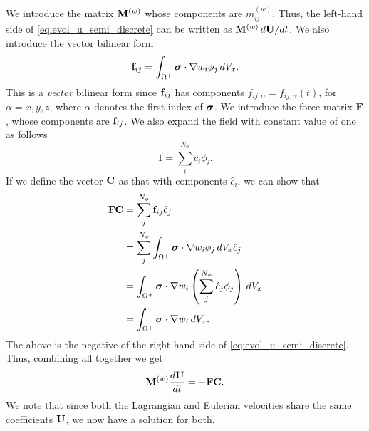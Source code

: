 \documentclass[11pt]{report}
\begin{document}
We introduce the matrix $\mathbf{M}^{(w)}$ whose components are $m_{ij}^{(w)}$. Thus, the left-hand side of \cref{eq:evol_u_semi_discrete} can be written as $\mathbf{M}^{(w)} \, d\mathbf{U} / dt$.
We also introduce the vector bilinear form
\begin{equation}
    \mathbf{f}_{ij} = \int_{\Omega^+} \bm \sigma \cdot \nabla w_i \phi_j \, dV_x.
\end{equation}
This is a \textit{vector} bilinear form since $\mathbf{f}_{ij}$ has components $f_{ij,\alpha} = f_{ij,\alpha}(t)$, for $\alpha = x,y,z$, where $\alpha$ denotes the first index of $\bm \sigma$. We introduce the force matrix $\mathbf{F}$, whose components are $\mathbf{f}_{ij}$. We also expand the field with constant value of one as follows
\begin{equation}
    1 = \sum_i^{N_\phi} \hat{c}_i \phi_i.
\end{equation}
If we define the vector $\mathbf{C}$ as that with components $\hat{c}_i$, we can show that 
\begin{align}
    \mathbf{F} \mathbf{C} &= \sum_j^{N_\phi} \mathbf{f}_{ij} \hat{c}_j \nonumber \\
    &= \sum_j^{N_\phi} \int_{\Omega^+} \bm \sigma \cdot \nabla w_i \phi_j \, dV_x \hat{c}_j \nonumber \\
    &= \int_{\Omega^+} \bm \sigma \cdot \nabla w_i \left ( \sum_j^{N_\phi} \hat{c}_j \phi_j \right ) \, dV_x \nonumber \\
    &= \int_{\Omega^+} \bm \sigma \cdot \nabla w_i \, dV_x.
\end{align}
The above is the negative of the right-hand side of \cref{eq:evol_u_semi_discrete}. Thus, combining all together we get
\begin{equation}
    \label{eq:evol_vel_semi_discrete}
    \mathbf{M}^{(w)} \frac{d\mathbf{U}}{dt} = -\mathbf{F} \mathbf{C}.
\end{equation}
We note that since both the Lagrangian and Eulerian velocities share the same coefficients $\mathbf{U}$, we now have a solution for both.

\end{document}
